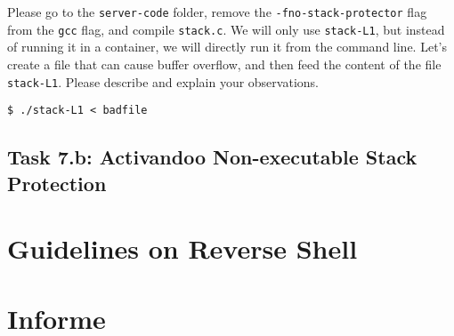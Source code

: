 Please go to the \texttt{server-code} folder, remove the 
\texttt{-fno-stack-protector} flag from the 
\texttt{gcc} flag, and compile \texttt{stack.c}. 
We will only use \texttt{stack-L1}, but 
instead of running it in a container, we will directly 
run it from the command line. Let's create a file
that can cause buffer overflow, and then feed the 
content of the file \texttt{stack-L1}. Please 
describe and explain your observations. 

\begin{lstlisting}
$ ./stack-L1 < badfile 
\end{lstlisting}
 

\subsection{Task 7.b: Activandoo Non-executable Stack Protection}




\section{Guidelines on Reverse Shell} 
\label{sec:guildelines}






\section{Informe}




